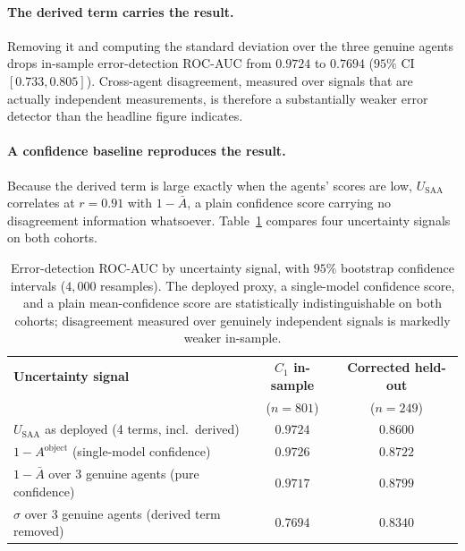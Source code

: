 \documentclass[12pt,a4paper]{report}
\begin{document}
\paragraph{The derived term carries the result.} Removing it and computing the standard deviation over the three genuine agents drops in-sample error-detection ROC-AUC from $\mathbf{0.9724}$ to $\mathbf{0.7694}$ ($95\%$ CI $[0.733, 0.805]$). Cross-agent disagreement, measured over signals that are actually independent measurements, is therefore a substantially weaker error detector than the headline figure indicates.

\paragraph{A confidence baseline reproduces the result.} Because the derived term is large exactly when the agents' scores are low, $U_{\text{SAA}}$ correlates at $r=0.91$ with $1-\bar{A}$, a plain confidence score carrying no disagreement information whatsoever. Table~\ref{tab:signal_decomposition} compares four uncertainty signals on both cohorts.

\begin{table}[!htbp]
\centering
\caption[Error-detection ROC-AUC by uncertainty signal, with bootstrap intervals]{Error-detection ROC-AUC by uncertainty signal, with $95\%$ bootstrap confidence intervals ($4{,}000$ resamples). The deployed proxy, a single-model confidence score, and a plain mean-confidence score are statistically indistinguishable on both cohorts; disagreement measured over genuinely independent signals is markedly weaker in-sample.}
\label{tab:signal_decomposition}
\small
\begin{tabular}{lcc}
\toprule
\textbf{Uncertainty signal} & \textbf{$C_1$ in-sample} & \textbf{Corrected held-out} \\
 & ($n=801$) & ($n=249$) \\
\midrule
$U_{\text{SAA}}$ as deployed (4 terms, incl.\ derived) & $\mathbf{0.9724}$ & $\mathbf{0.8600}$ \\
$1 - A^{\text{object}}$ (single-model confidence) & $0.9726$ & $0.8722$ \\
$1 - \bar{A}$ over 3 genuine agents (pure confidence) & $0.9717$ & $0.8799$ \\
$\sigma$ over 3 genuine agents (derived term removed) & $0.7694$ & $0.8340$ \\
\bottomrule
\end{tabular}
\end{table}
\end{document}
